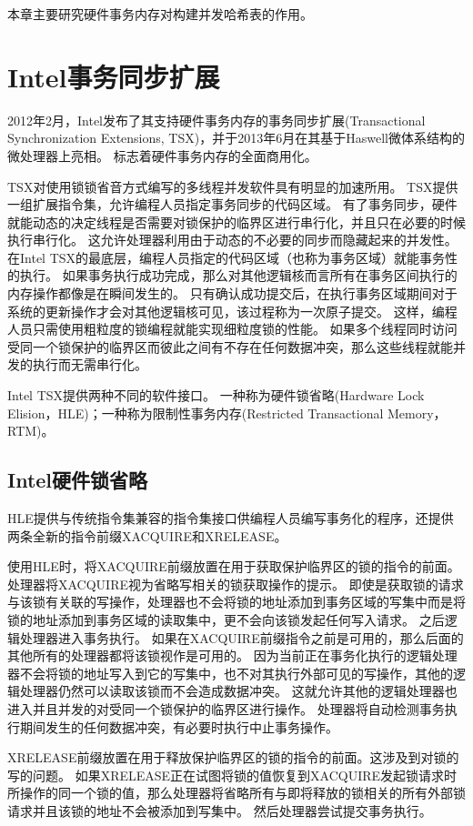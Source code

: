 本章主要研究硬件事务内存对构建并发哈希表的作用。

\section{Intel事务同步扩展}
2012年2月，Intel发布了其支持硬件事务内存的事务同步扩展(Transactional Synchronization Extensions, TSX)，并于2013年6月在其基于Haswell微体系结构的微处理器上亮相。
标志着硬件事务内存的全面商用化。

TSX对使用锁锁省音方式编写的多线程并发软件具有明显的加速所用。 
TSX提供一组扩展指令集，允许编程人员指定事务同步的代码区域。
有了事务同步，硬件就能动态的决定线程是否需要对锁保护的临界区进行串行化，并且只在必要的时候执行串行化。
这允许处理器利用由于动态的不必要的同步而隐藏起来的并发性。
在Intel TSX的最底层，编程人员指定的代码区域（也称为事务区域）就能事务性的执行。
如果事务执行成功完成，那么对其他逻辑核而言所有在事务区间执行的内存操作都像是在瞬间发生的。
只有确认成功提交后，在执行事务区域期间对于系统的更新操作才会对其他逻辑核可见，该过程称为一次原子提交。
这样，编程人员只需使用粗粒度的锁编程就能实现细粒度锁的性能。
如果多个线程同时访问受同一个锁保护的临界区而彼此之间有不存在任何数据冲突，那么这些线程就能并发的执行而无需串行化。

Intel TSX提供两种不同的软件接口。
一种称为硬件锁省略(Hardware Lock Elision，HLE)；一种称为限制性事务内存(Restricted Transactional Memory，RTM)。

\subsection{Intel硬件锁省略}
HLE提供与传统指令集兼容的指令集接口供编程人员编写事务化的程序，还提供两条全新的指令前缀XACQUIRE和XRELEASE。

使用HLE时，将XACQUIRE前缀放置在用于获取保护临界区的锁的指令的前面。
处理器将XACQUIRE视为省略写相关的锁获取操作的提示。
即使是获取锁的请求与该锁有关联的写操作，处理器也不会将锁的地址添加到事务区域的写集中而是将锁的地址添加到事务区域的读取集中，更不会向该锁发起任何写入请求。
之后逻辑处理器进入事务执行。
如果在XACQUIRE前缀指令之前是可用的，那么后面的其他所有的处理器都将该锁视作是可用的。
因为当前正在事务化执行的逻辑处理器不会将锁的地址写入到它的写集中，也不对其执行外部可见的写操作，其他的逻辑处理器仍然可以读取该锁而不会造成数据冲突。
这就允许其他的逻辑处理器也进入并且并发的对受同一个锁保护的临界区进行操作。
处理器将自动检测事务执行期间发生的任何数据冲突，有必要时执行中止事务操作。

XRELEASE前缀放置在用于释放保护临界区的锁的指令的前面。这涉及到对锁的写的问题。
如果XRELEASE正在试图将锁的值恢复到XACQUIRE发起锁请求时所操作的同一个锁的值，那么处理器将省略所有与即将释放的锁相关的所有外部锁请求并且该锁的地址不会被添加到写集中。
然后处理器尝试提交事务执行。

